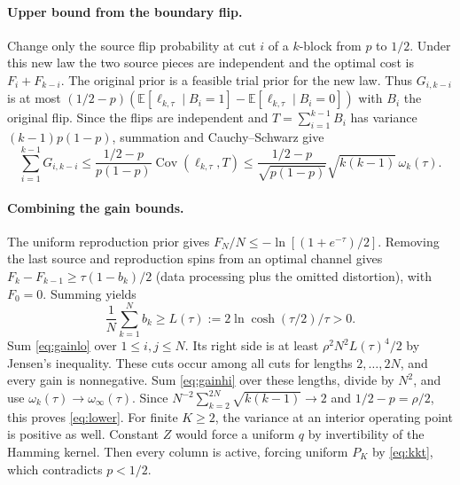 \documentclass[11pt,letterpaper]{article}
\theoremstyle{definition}
\newcommand{\E}{\mathbb E}
\newcommand{\Cov}{\operatorname{Cov}}
\begin{document}
\paragraph{Upper bound from the boundary flip.}
Change only the source flip probability at cut $i$ of a $k$-block from $p$ to $1/2$. Under this new law the two source pieces are independent and the optimal cost is $F_i+F_{k-i}$. The original prior is a feasible trial prior for the new law. Thus $G_{i,k-i}$ is at most $(1/2-p)(\E[\ell_{k,\tau}\mid B_i=1]-\E[\ell_{k,\tau}\mid B_i=0])$ with $B_i$ the original flip. Since the flips are independent and $T=\sum_{i=1}^{k-1}B_i$ has variance $(k-1)p(1-p)$, summation and Cauchy--Schwarz give
\begin{equation}
 \sum_{i=1}^{k-1}G_{i,k-i}
 \le\frac{1/2-p}{p(1-p)}\Cov(\ell_{k,\tau},T)
 \le\frac{1/2-p}{\sqrt{p(1-p)}}\sqrt{k(k-1)}\,\omega_k(\tau).             \label{eq:gainhi}
\end{equation}

\paragraph{Combining the gain bounds.}
The uniform reproduction prior gives $F_N/N\le-\ln[(1+e^{-\tau})/2]$. Removing the last source and reproduction spins from an optimal channel gives $F_k-F_{k-1}\ge \tau(1-b_k)/2$ (data processing plus the omitted distortion), with $F_0=0$. Summing yields
\[
 \frac1N\sum_{k=1}^N b_k\ge L(\tau):=2\ln\cosh(\tau/2)/\tau>0 .
\]
Sum \eqref{eq:gainlo} over $1\le i,j\le N$. Its right side is at least $\rho^2N^2L(\tau)^4/2$ by Jensen's inequality. These cuts occur among all cuts for lengths $2,\dots,2N$, and every gain is nonnegative. Sum \eqref{eq:gainhi} over these lengths, divide by $N^2$, and use $\omega_k(\tau)\to \omega_\infty(\tau)$. Since $N^{-2}\sum_{k=2}^{2N}\sqrt{k(k-1)}\to2$ and $1/2-p=\rho/2$, this proves \eqref{eq:lower}. For finite $K\ge2$, the variance at an interior operating point is positive as well. Constant $Z$ would force a uniform $q$ by invertibility of the Hamming kernel. Then every column is active, forcing uniform $P_K$ by \eqref{eq:kkt}, which contradicts $p<1/2$.
\end{document}
